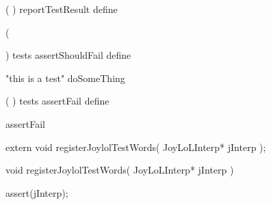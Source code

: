 \stopTestSuite

\startTestSuite[reportTestResult]

\startJoylolCode
  (
  )
  reportTestResult
  define
\stopJoylolCode

\stopTestSuite

\startTestSuite[assertShouldFail]

\startJoylolCode

(
  
)
tests
assertShouldFail
define
\stopJoylolCode

\startJoylolTest
"this is a test"
doSomeThing
\stopJoylolTest
\stopTestCase
\stopTestSuite

\startTestSuite[assertFail]

\startJoylolCode
(
)
tests
assertFail
define
\stopJoylolCode

\startJoylolTest
assertFail
\stopJoylolTest
\stopTestCase
\stopTestSuite

\startTestSuite[assertSucceed]

\stopTestSuite

\startTestSuite[assertTrue]

\stopTestSuite

\startTestSuite[assertFalse]

\stopTestSuite

\startTestSuite[assertNil]

\stopTestSuite

\startTestSuite[assertNotNil]

\stopTestSuite

\startTestSuite[assertAtom]

\stopTestSuite

\startTestSuite[assertPair]

\stopTestSuite

\startTestSuite[assertNatural]

\stopTestSuite

\startTestSuite[assertSymbol]

\stopTestSuite

\startTestSuite[assertContext]

\stopTestSuite

\startTestSuite[assertDictionary]

\stopTestSuite

\startTestSuite[assertDictNode]

\stopTestSuite


\startCHeader
extern void registerJoylolTestWords(
  JoyLoLInterp* jInterp
);
\stopCHeader
{}

\startCCode
void registerJoylolTestWords(
  JoyLoLInterp* jInterp
) {
  assert(jInterp);

}
\stopCCode